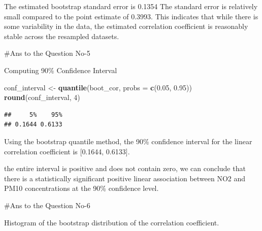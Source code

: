 \documentclass[
]{article}
\newenvironment{Shaded}{\begin{snugshade}}{\end{snugshade}}
\newcommand{\AttributeTok}[1]{\textcolor[rgb]{0.13,0.29,0.53}{#1}}
\newcommand{\DecValTok}[1]{\textcolor[rgb]{0.00,0.00,0.81}{#1}}
\newcommand{\FloatTok}[1]{\textcolor[rgb]{0.00,0.00,0.81}{#1}}
\newcommand{\FunctionTok}[1]{\textcolor[rgb]{0.13,0.29,0.53}{\textbf{#1}}}
\newcommand{\NormalTok}[1]{#1}
\newcommand{\OtherTok}[1]{\textcolor[rgb]{0.56,0.35,0.01}{#1}}
\begin{document}
The estimated bootstrap standard error is 0.1354 The standard error is
relatively small compared to the point estimate of 0.3993. This
indicates that while there is some variability in the data, the
estimated correlation coefficient is reasonably stable across the
resampled datasets.

\#Ans to the Question No-5

Computing 90\% Confidence Interval

\begin{Shaded}
\begin{Highlighting}[]
\NormalTok{conf\_interval }\OtherTok{\textless{}{-}} \FunctionTok{quantile}\NormalTok{(boot\_cor, }\AttributeTok{probs =} \FunctionTok{c}\NormalTok{(}\FloatTok{0.05}\NormalTok{, }\FloatTok{0.95}\NormalTok{))}
\FunctionTok{round}\NormalTok{(conf\_interval, }\DecValTok{4}\NormalTok{)}
\end{Highlighting}
\end{Shaded}

\begin{verbatim}
##     5%    95% 
## 0.1644 0.6133
\end{verbatim}

Using the bootstrap quantile method, the 90\% confidence interval for
the linear correlation coefficient is {[}0.1644, 0.6133{]}.

the entire interval is positive and does not contain zero, we can
conclude that there is a statistically significant positive linear
association between NO2 and PM10 concentrations at the 90\% confidence
level.

\#Ans to the Question No-6

Histogram of the bootstrap distribution of the correlation coefficient.
\end{document}
